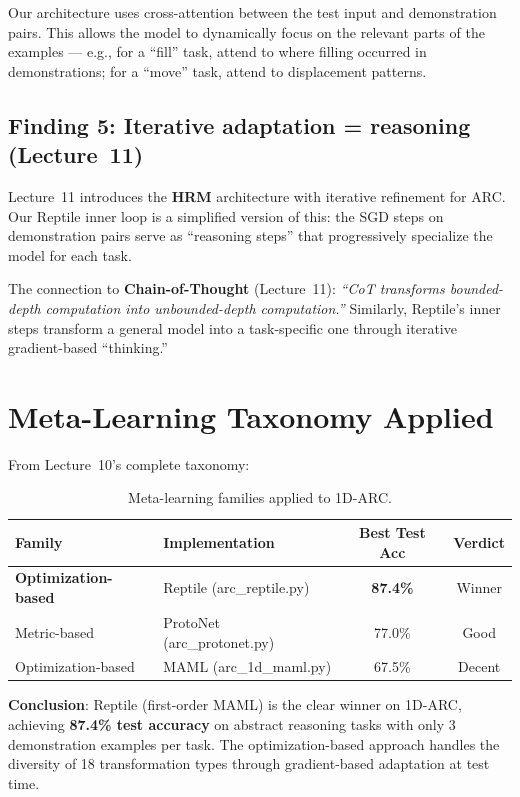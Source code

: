 \documentclass[11pt,a4paper]{article}
\begin{document}
Our architecture uses cross-attention between the test input and demonstration pairs. This allows the model to dynamically focus on the relevant parts of the examples --- e.g., for a ``fill'' task, attend to where filling occurred in demonstrations; for a ``move'' task, attend to displacement patterns.

\subsection{Finding 5: Iterative adaptation = reasoning (Lecture~11)}

Lecture~11 introduces the \textbf{HRM} architecture with iterative refinement for ARC. Our Reptile inner loop is a simplified version of this: the SGD steps on demonstration pairs serve as ``reasoning steps'' that progressively specialize the model for each task.

The connection to \textbf{Chain-of-Thought} (Lecture~11): \emph{``CoT transforms bounded-depth computation into unbounded-depth computation.''} Similarly, Reptile's inner steps transform a general model into a task-specific one through iterative gradient-based ``thinking.''

\section{Meta-Learning Taxonomy Applied}

From Lecture~10's complete taxonomy:

\begin{table}[H]
\centering
\caption{Meta-learning families applied to 1D-ARC.}
\begin{tabular}{llcc}
\toprule
\textbf{Family} & \textbf{Implementation} & \textbf{Best Test Acc} & \textbf{Verdict} \\
\midrule
\textbf{Optimization-based} & Reptile (arc\_reptile.py) & \textbf{87.4\%} & Winner \\
Metric-based & ProtoNet (arc\_protonet.py) & 77.0\% & Good \\
Optimization-based & MAML (arc\_1d\_maml.py) & 67.5\% & Decent \\
\bottomrule
\end{tabular}
\end{table}

\textbf{Conclusion}: Reptile (first-order MAML) is the clear winner on 1D-ARC, achieving \textbf{87.4\% test accuracy} on abstract reasoning tasks with only 3 demonstration examples per task. The optimization-based approach handles the diversity of 18 transformation types through gradient-based adaptation at test time.
\end{document}
